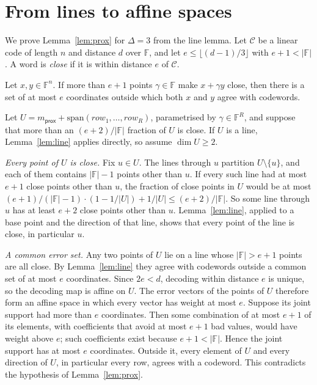 \documentclass[sigconf,anonymous]{acmart}
\newcommand{\F}{\mathbb{F}}
\begin{document}



\appendix

\section{From lines to affine spaces}
\label{app:prox}

We prove Lemma~\ref{lem:prox} for $\Delta=3$ from the line lemma. Let $\mathcal{C}$ be a linear
code of length $n$ and distance $d$ over $\F$, and let $e\le\lfloor(d-1)/3\rfloor$ with $e+1<|\F|$.
A word is \emph{close} if it is within distance $e$ of $\mathcal{C}$.

\begin{lemma}\label{lem:line}
Let $x,y\in\F^n$. If more than $e+1$ points $\gamma\in\F$ make $x+\gamma y$ close, then there is a
set of at most $e$ coordinates outside which both $x$ and $y$ agree with codewords.
\end{lemma}

Let $U=m_{\mathsf{prox}}+\mathrm{span}(\mathit{row}_1,\dots,\mathit{row}_R)$, parametrised by
$\gamma\in\F^{R}$, and suppose that more than an $(e+2)/|\F|$ fraction of $U$ is close. If $U$ is a
line, Lemma~\ref{lem:line} applies directly, so assume $\dim U\ge 2$.

\emph{Every point of $U$ is close.} Fix $u\in U$. The lines through $u$ partition
$U\setminus\{u\}$, and each of them contains $|\F|-1$ points other than $u$. If every such line had
at most $e+1$ close points other than $u$, the fraction of close points in $U$ would be at most
$(e+1)/(|\F|-1)\cdot(1-1/|U|)+1/|U|\le(e+2)/|\F|$. So some line through $u$ has at least $e+2$ close
points other than $u$. Lemma~\ref{lem:line}, applied to a base point and the direction of that line,
shows that every point of the line is close, in particular $u$.

\emph{A common error set.} Any two points of $U$ lie on a line whose $|\F|>e+1$ points are all close.
By Lemma~\ref{lem:line} they agree with codewords outside a common set of at most $e$ coordinates.
Since $2e<d$, decoding within distance $e$ is unique, so the decoding map is affine on $U$. The error
vectors of the points of $U$ therefore form an affine space in which every vector has weight at most
$e$. Suppose its joint support had more than $e$ coordinates. Then some combination of at most $e+1$
of its elements, with coefficients that avoid at most $e+1$ bad values, would have weight above $e$;
such coefficients exist because $e+1<|\F|$. Hence the joint support has at most $e$ coordinates.
Outside it, every element of $U$ and every direction of $U$, in particular every row, agrees with a
codeword. This contradicts the hypothesis of Lemma~\ref{lem:prox}.
\end{document}
